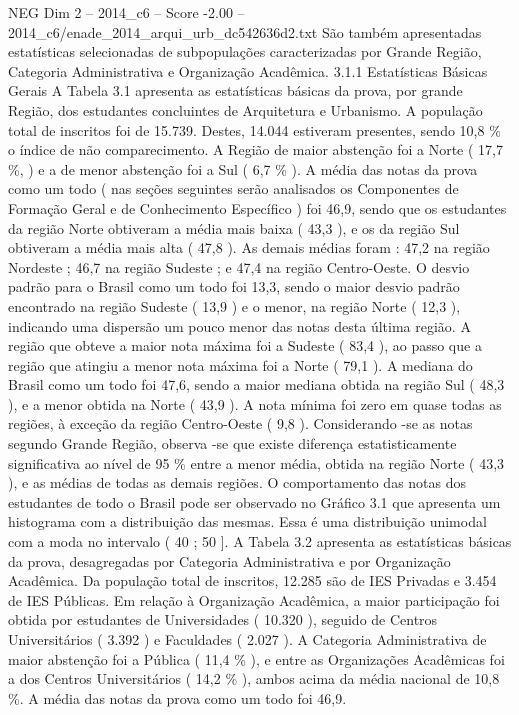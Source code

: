 \begin{textsample}{NEG Dim 2 – 2014\_c6 – Score -2.00 – 2014\_c6/enade\_2014\_arqui\_urb\_dc542636d2.txt}
São também apresentadas estatísticas selecionadas de subpopulações caracterizadas por Grande Região, Categoria Administrativa e Organização Acadêmica. 3.1.1 Estatísticas Básicas Gerais A Tabela 3.1 apresenta as estatísticas básicas da prova, por grande Região, dos estudantes concluintes de Arquitetura e Urbanismo.
A população total de inscritos foi de 15.739.
Destes, 14.044 estiveram presentes, sendo 10,8 \% o índice de não comparecimento.
A Região de maior abstenção foi a Norte ( 17,7 \%, ) e a de menor abstenção foi a Sul ( 6,7 \% ).
A média das notas da prova como um todo ( nas seções seguintes serão analisados os Componentes de Formação Geral e de Conhecimento Específico ) foi 46,9, sendo que os estudantes da região Norte obtiveram a média mais baixa ( 43,3 ), e os da região Sul obtiveram a média mais alta ( 47,8 ).
As demais médias foram : 47,2 na região Nordeste ; 46,7 na região Sudeste ; e 47,4 na região Centro-Oeste.
O desvio padrão para o Brasil como um todo foi 13,3, sendo o maior desvio padrão encontrado na região Sudeste ( 13,9 ) e o menor, na região Norte ( 12,3 ), indicando uma dispersão um pouco menor das notas desta última região.
A região que obteve a maior nota máxima foi a Sudeste ( 83,4 ), ao passo que a região que atingiu a menor nota máxima foi a Norte ( 79,1 ).
A mediana do Brasil como um todo foi 47,6, sendo a maior mediana obtida na região Sul ( 48,3 ), e a menor obtida na Norte ( 43,9 ).
A nota mínima foi zero em quase todas as regiões, à exceção da região Centro-Oeste ( 9,8 ).
Considerando -se as notas segundo Grande Região, observa -se que existe diferença estatisticamente significativa ao nível de 95 \% entre a menor média, obtida na região Norte ( 43,3 ), e as médias de todas as demais regiões.
O comportamento das notas dos estudantes de todo o Brasil pode ser observado no Gráfico 3.1 que apresenta um histograma com a distribuição das mesmas.
Essa é uma distribuição unimodal com a moda no intervalo ( 40 ; 50 ].
A Tabela 3.2 apresenta as estatísticas básicas da prova, desagregadas por Categoria Administrativa e por Organização Acadêmica.
Da população total de inscritos, 12.285 são de IES Privadas e 3.454 de IES Públicas.
Em relação à Organização Acadêmica, a maior participação foi obtida por estudantes de Universidades ( 10.320 ), seguido de Centros Universitários ( 3.392 ) e Faculdades ( 2.027 ).
A Categoria Administrativa de maior abstenção foi a Pública ( 11,4 \% ), e entre as Organizações Acadêmicas foi a dos Centros Universitários ( 14,2 \% ), ambos acima da média nacional de 10,8 \%.
A média das notas da prova como um todo foi 46,9.

\end{textsample}
